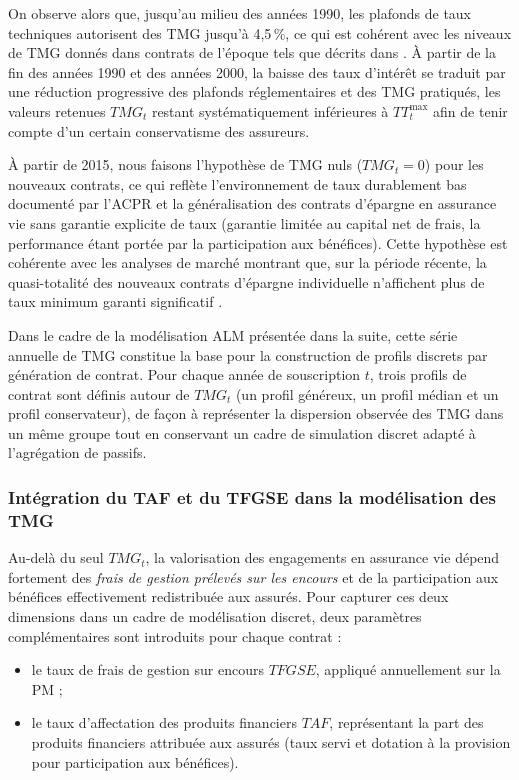 On observe alors que, jusqu'au milieu des années 1990, les plafonds de taux techniques autorisent des TMG jusqu'à 4{,}5\,\%, ce qui est cohérent avec les niveaux de TMG donnés dans contrats de l'époque tels que décrits dans \cite{acpr66,gvmTMG}. À partir de la fin des années 1990 et des années 2000, la baisse des taux d'intérêt se traduit par une réduction progressive des plafonds réglementaires et des TMG pratiqués, les valeurs retenues $TMG_t$ restant systématiquement inférieures à $TT^{\max}_t$ afin de tenir compte d'un certain conservatisme des assureurs.

À partir de 2015, nous faisons l'hypothèse de TMG nuls ($TMG_t = 0$) pour les nouveaux contrats, ce qui reflète l'environnement de taux durablement bas documenté par l'ACPR \cite{acprTauxBas} et la généralisation des contrats d'épargne en assurance vie sans garantie explicite de taux (garantie limitée au capital net de frais, la performance étant portée par la participation aux bénéfices). Cette hypothèse est cohérente avec les analyses de marché montrant que, sur la période récente, la quasi-totalité des nouveaux contrats d'épargne individuelle n'affichent plus de taux minimum garanti significatif \cite{gvmTMG}.

Dans le cadre de la modélisation ALM présentée dans la suite, cette série annuelle de TMG constitue la base pour la construction de profils discrets par génération de contrat. Pour chaque année de souscription $t$, trois profils de contrat sont définis autour de $TMG_t$ (un profil généreux, un profil médian et un profil conservateur), de façon à représenter la dispersion observée des TMG dans un même groupe tout en conservant un cadre de simulation discret adapté à l’agrégation de passifs.

\subsubsection*{Intégration du TAF et du TFGSE dans la modélisation des TMG}

Au-delà du seul $TMG_t$, la valorisation des engagements en assurance vie dépend fortement des \emph{frais de gestion prélevés sur les encours} et de la participation aux bénéfices effectivement redistribuée aux assurés. Pour capturer ces deux dimensions dans un cadre de modélisation discret, deux paramètres complémentaires sont introduits pour chaque contrat :
\begin{itemize}
  \item le taux de frais de gestion sur encours $TFGSE$, appliqué annuellement sur la PM ;
  \item le taux d'affectation des produits financiers $TAF$, représentant la part des produits financiers attribuée aux assurés (taux servi et dotation à la provision pour participation aux bénéfices).
\end{itemize}

